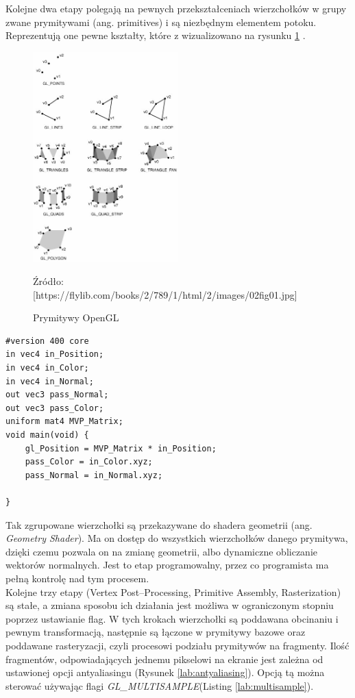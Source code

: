 \documentclass[archive]{mgr}
\begin{document}
Kolejne dwa etapy polegają na pewnych przekształceniach wierzchołków w grupy zwane prymitywami (ang. primitives) i są niezbędnym elementem potoku. Reprezentują one pewne kształty, które z wizualizowano na rysunku \ref{lab:primitives} \cite{OpenGLPrimitives}.
\begin{figure}[h!]
  \centering
    \includegraphics[width=0.50\textwidth]{images/primitives.jpg}
   \caption{Prymitywy OpenGL}
   Źródło: [https://flylib.com/books/2/789/1/html/2/images/02fig01.jpg]
   \label{lab:primitives}
\end{figure}
\begin{lstlisting}[caption={Kod shadera wierzchołków},captionpos=b,label={lab:vertexshader}]
#version 400 core
in vec4 in_Position;
in vec4 in_Color;  
in vec4 in_Normal;
out vec3 pass_Normal;
out vec3 pass_Color;
uniform mat4 MVP_Matrix;
void main(void) {
	gl_Position = MVP_Matrix * in_Position;
	pass_Color = in_Color.xyz;
	pass_Normal = in_Normal.xyz;

}
\end{lstlisting}
\newpage
Tak zgrupowane wierzchołki są przekazywane do shadera geometrii (ang. \emph{Geometry Shader}). Ma on dostęp do wszystkich wierzchołków danego prymitywa, dzięki czemu pozwala on na zmianę geometrii, albo dynamiczne obliczanie wektorów normalnych. Jest to etap programowalny, przez co programista ma pełną kontrolę nad tym procesem.\\

Kolejne trzy etapy (Vertex Post–Processing, Primitive Assembly, Rasterization) są stałe, a zmiana sposobu ich działania jest możliwa w ograniczonym stopniu poprzez ustawianie flag. W tych krokach wierzchołki są poddawana obcinaniu i pewnym transformacją, następnie są łączone w prymitywy bazowe oraz poddawane rasteryzacji, czyli procesowi podziału prymitywów na fragmenty. Ilość fragmentów, odpowiadających jednemu pikselowi na ekranie jest zależna od ustawionej opcji antyaliasingu (Rysunek \ref{lab:antyaliasing}). Opcją tą można sterować używając flagi \emph{GL\_MULTISAMPLE}(Listing \ref{lab:multisample}).
\end{document}
